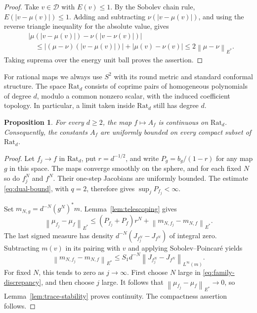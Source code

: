 \documentclass[10pt,a4paper]{amsart}
\newtheorem{proposition}[theorem]{Proposition}
\newcommand{\Dcal}{\mathcal D}
\newcommand{\norm}[1]{\left\lVert #1\right\rVert}
\numberwithin{equation}{section}
\begin{document}
\begin{proof}
Take $v\in\Dcal$ with $E(v)\le1$. By the Sobolev chain rule, $E(|v-\mu(v)|)\le1$. Adding and subtracting $\nu(|v-\mu(v)|)$, and using the reverse triangle inequality for the absolute value, gives
\begin{align*}
 &\big|\mu(|v-\mu(v)|)-\nu(|v-\nu(v)|)\big|\\
 &\quad\le |(\mu-\nu)(|v-\mu(v)|)|+|\mu(v)-\nu(v)|
 \le2\norm{\mu-\nu}_{E^*}.
\end{align*}
Taking suprema over the energy unit ball proves the assertion.
\end{proof}

For rational maps we always use $S^2$ with its round metric and standard conformal structure. The space $\mathrm{Rat}_d$ consists of coprime pairs of homogeneous polynomials of degree $d$, modulo a common nonzero scalar, with the induced coefficient topology. In particular, a limit taken inside $\mathrm{Rat}_d$ still has degree $d$.

\begin{proposition}\label{prop:rational-continuity}
For every $d\ge2$, the map $f\mapsto A_f$ is continuous on $\mathrm{Rat}_d$. Consequently, the constants $A_f$ are uniformly bounded on every compact subset of $\mathrm{Rat}_d$.
\end{proposition}

\begin{proof}
Let $f_j\to f$ in $\mathrm{Rat}_d$, put $r=d^{-1/2}$, and write $P_g=b_g/(1-r)$ for any map $g$ in this space. The maps converge smoothly on the sphere, and for each fixed $N$ so do $f_j^N$ and $f^N$. Their one-step Jacobians are uniformly bounded. The estimate \eqref{eq:dual-bound}, with $q=2$, therefore gives $\sup_j P_{f_j}<\infty$.

Set $m_{N,g}=d^{-N}(g^N)^*m$. Lemma~\ref{lem:telescoping} gives
\begin{equation}\label{eq:family-discrepancy}
 \norm{\mu_{f_j}-\mu_f}_{E^*}
 \le (P_{f_j}+P_f)r^N
       +\norm{m_{N,f_j}-m_{N,f}}_{E^*}.
\end{equation}
The last signed measure has density $d^{-N}(J_{f_j^N}-J_{f^N})$ of integral zero. Subtracting $m(v)$ in its pairing with $v$ and applying Sobolev--Poincar\'e yields
\[
 \norm{m_{N,f_j}-m_{N,f}}_{E^*}
 \le S_1d^{-N}\norm{J_{f_j^N}-J_{f^N}}_{L^\infty(m)}.
\]
For fixed $N$, this tends to zero as $j\to\infty$. First choose $N$ large in \eqref{eq:family-discrepancy}, and then choose $j$ large. It follows that $\norm{\mu_{f_j}-\mu_f}_{E^*}\to0$, so Lemma~\ref{lem:trace-stability} proves continuity. The compactness assertion follows.
\end{proof}
\end{document}
